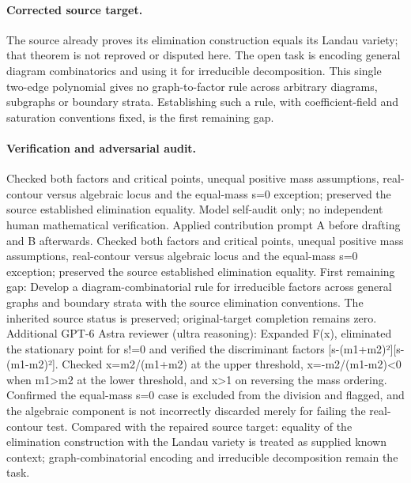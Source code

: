 \documentclass[11pt]{article}
\begin{document}
\paragraph{Corrected source target.} The source already proves its elimination construction equals its Landau variety; that theorem is not reproved or disputed here. The open task is encoding general diagram combinatorics and using it for irreducible decomposition. This single two-edge polynomial gives no graph-to-factor rule across arbitrary diagrams, subgraphs or boundary strata. Establishing such a rule, with coefficient-field and saturation conventions fixed, is the first remaining gap.

\paragraph{Verification and adversarial audit.}
Checked both factors and critical points, unequal positive mass assumptions, real-contour versus algebraic locus and the equal-mass s=0 exception; preserved the source established elimination equality. Model self-audit only; no independent human mathematical verification. Applied contribution prompt A before drafting and B afterwards. Checked both factors and critical points, unequal positive mass assumptions, real-contour versus algebraic locus and the equal-mass s=0 exception; preserved the source established elimination equality. First remaining gap: Develop a diagram-combinatorial rule for irreducible factors across general graphs and boundary strata with the source elimination conventions. The inherited source status is preserved; original-target completion remains zero. Additional GPT-6 Astra reviewer (ultra reasoning): Expanded F(x), eliminated the stationary point for s!=0 and verified the discriminant factors [s-(m1+m2)²][s-(m1-m2)²]. Checked x=m2/(m1+m2) at the upper threshold, x=-m2/(m1-m2)<0 when m1>m2 at the lower threshold, and x>1 on reversing the mass ordering. Confirmed the equal-mass s=0 case is excluded from the division and flagged, and the algebraic component is not incorrectly discarded merely for failing the real-contour test. Compared with the repaired source target: equality of the elimination construction with the Landau variety is treated as supplied known context; graph-combinatorial encoding and irreducible decomposition remain the task.
\end{document}
